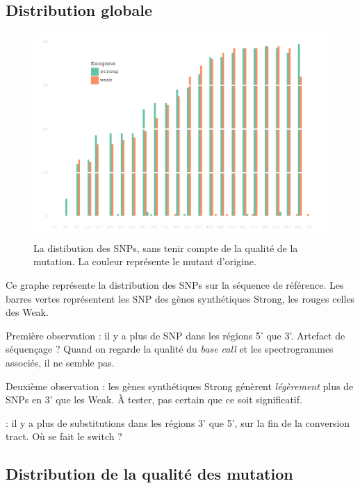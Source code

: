\documentclass[a4paper]{tufte-handout}
\begin{document}
\subsection{Distribution globale}
\label{sec:orgheadline5}
\begin{figure}[h]
  \centering
  \includegraphics[width=\linewidth]{../snp_distribution.pdf}
  \caption{La distibution des SNPs, sans tenir compte de la qualité de la
    mutation. La couleur représente le mutant d'origine.}
  \label{fig:snpdistrib}
\end{figure}

Ce graphe représente la distribution des SNPs sur la séquence de référence. Les
barres vertes représentent les SNP des gènes synthétiques Strong, les rouges
celles des Weak. 

Première observation : il y a plus de SNP dans les régions 5' que 3'. Artefact
de séquençage ? Quand on regarde la qualité du \emph{base call} et les spectrogrammes
associés, il ne semble pas. 

Deuxième observation : les gènes synthétiques Strong génèrent \emph{légèrement} plus
de SNPs en 3' que les Weak. À tester, pas certain que ce soit significatif.

 : il y a plus de substitutions dans les régions 3' que 5',
sur la fin de la conversion tract. Où se fait le switch ? 


\newpage
\subsection{Distribution de la qualité des mutation}
\label{sec:orgheadline6}
\end{document}
